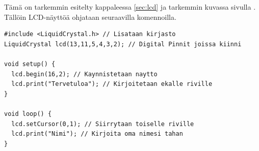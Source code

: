\begin{tcolorbox}[title=LCD-näyttö,colback=blue!10,colbacktitle=purple!90]
Tämä on tarkemmin esitelty kappaleessa \ref{sec:lcd} ja tarkemmin kuvassa sivulla \pageref{fig:lcd}. Tällöin LCD-näyttöä ohjataan seuraavilla komennoilla.

\begin{lstlisting}[numbers=none]
#include <LiquidCrystal.h> // Lisataan kirjasto 
LiquidCrystal lcd(13,11,5,4,3,2); // Digital Pinnit joissa kiinni

void setup() {
  lcd.begin(16,2); // Kaynnistetaan naytto
  lcd.print("Tervetuloa"); // Kirjoitetaan ekalle riville
}

void loop() {
  lcd.setCursor(0,1); // Siirrytaan toiselle riville
  lcd.print("Nimi"); // Kirjoita oma nimesi tahan
}
\end{lstlisting}


\end{tcolorbox}